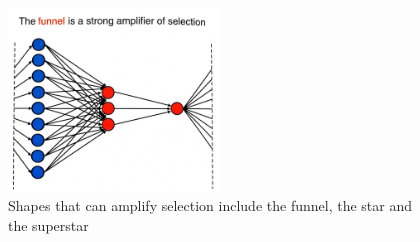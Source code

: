 \documentclass[]{final_report}
\begin{document}
\begin{figure}
	\center
	\includegraphics[width=0.5\textwidth]{funnel_amplifier.jpg}
	\caption{Shapes that can amplify selection include the funnel, the star and the superstar~\cite{nowak2006evolutionary}}
	\label{fig:funnel}
\end{figure}
\end{document}
